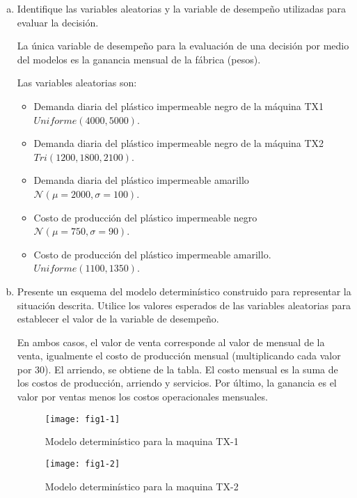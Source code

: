 \documentclass[../main.tex]{subfiles}
\begin{document}
\begin{enumerate}[(a)]

\item Identifique las variables aleatorias y la variable de desempeño utilizadas
para evaluar la decisión.

La única variable de desempeño para la evaluación de una decisión por medio del modelos es la ganancia mensual de la fábrica (pesos).

Las variables aleatorias son:

\begin{itemize}
\item Demanda diaria del plástico impermeable negro de la máquina TX1 $Uniforme(4000, 5000)$.
\item Demanda diaria del plástico impermeable negro de la máquina TX2 $Tri(1200, 1800, 2100)$.
\item Demanda diaria del plástico impermeable amarillo $\mathcal{N} (\mu = 2000 , \sigma = 100)$.
\item Costo de producción del plástico impermeable negro  $\mathcal{N} (\mu = 750 , \sigma = 90)$.
\item Costo de producción del plástico impermeable amarillo.\\
$Uniforme(1100, 1350)$.
\end{itemize}

\item Presente un esquema del modelo determinístico construido para
representar la situación descrita. Utilice los valores esperados de las variables
aleatorias para establecer el valor de la variable de desempeño.

En ambos casos, el valor de venta corresponde al valor de mensual de la venta, igualmente el costo de producción mensual (multiplicando cada valor por 30). El arriendo, se obtiene de la tabla. El costo mensual es la suma de los costos de producción, arriendo y servicios. Por último, la ganancia es el valor por ventas menos los costos operacionales mensuales.

\begin{figure}[h]
\centering
\texttt{[image: fig1-1]}
\label{fig:img1}
\caption{Modelo determinístico para la maquina TX-1}
\end{figure}

\begin{figure}[h]
\centering
\texttt{[image: fig1-2]}
\label{fig:img1}
\caption{Modelo determinístico para la maquina TX-2}
\end{figure}


\end{enumerate}
\end{document}
